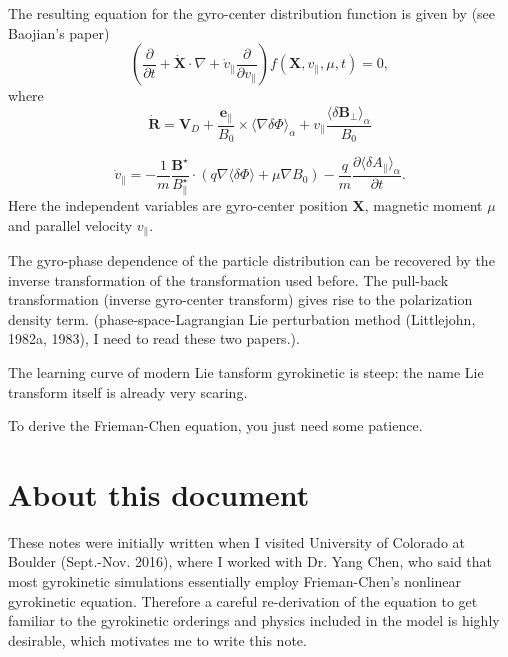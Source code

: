\documentclass{article}
\begin{document}
The resulting equation for the gyro-center distribution function is given by
(see Baojian's paper)
\begin{equation}
  \left( \frac{\partial}{\partial t} + \dot{\mathbf{X}} \cdot \nabla +
  \dot{v}_{\parallel} \frac{\partial}{\partial v_{\parallel}} \right) f
  (\mathbf{X}, v_{\parallel}, \mu, t) = 0,
\end{equation}
where
\begin{equation}
  \dot{\mathbf{R}} =\mathbf{V}_D + \frac{\mathbf{e}_{\parallel}}{B_0} \times
  \langle \nabla \delta \Phi \rangle_{\alpha} + v_{\parallel} \frac{\langle
  \delta \mathbf{B}_{\perp} \rangle_{\alpha}}{B_0}
\end{equation}

\begin{equation}
  \dot{v}_{\parallel} = - \frac{1}{m} 
  \frac{\mathbf{B}^{\star}}{B_{\parallel}^{\star}} \cdot (q \nabla \langle
  \delta \Phi \rangle + \mu \nabla B_0) - \frac{q}{m}  \frac{\partial \langle
  \delta A_{\parallel} \rangle_{\alpha}}{\partial t} .
\end{equation}
Here the independent variables are gyro-center position $\mathbf{X}$, magnetic
moment $\mu$ and parallel velocity $v_{\parallel}$.

The gyro-phase dependence of the particle distribution can be recovered by the
inverse transformation of the transformation used before. The pull-back
transformation (inverse gyro-center transform) gives rise to the polarization
density term. (phase-space-Lagrangian Lie perturbation method (Littlejohn,
1982a, 1983), I need to read these two papers.).

The learning curve of modern Lie tansform gyrokinetic is steep: the name Lie
transform itself is already very scaring.

To derive the Frieman-Chen equation, you just need some patience.

\section{About this document}

These notes were initially written when I visited University of Colorado at
Boulder (Sept.-Nov. 2016), where I worked with Dr. Yang Chen, who said that
most gyrokinetic simulations essentially employ Frieman-Chen's nonlinear
gyrokinetic equation. Therefore a careful re-derivation of the equation to get
familiar to the gyrokinetic orderings and physics included in the model is
highly desirable, which motivates me to write this note.
\end{document}
